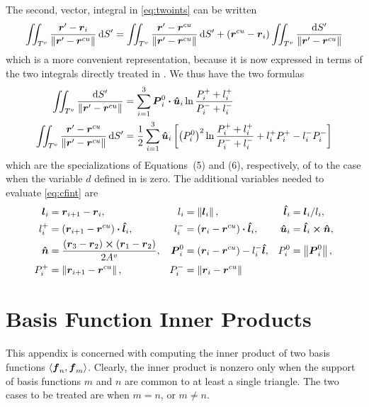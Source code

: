 \documentclass[
letterpaper, %
11pt, %
oneside, 
onecolumn, %
openany, %
]{memoir}
\numberwithin{equation}{chapter}
\numberwithin{figure}{chapter}
\begin{document}
 The second, vector, integral in \eqref{eq:twoints} can be written
 \begin{equation}
   \iint_{T^v} \frac{\boldsymbol{r}'-\boldsymbol{r}_i}{\left\lVert\boldsymbol{r}' - \boldsymbol{r}^{cu}\right\rVert} \, \text{d} S' =
   \iint_{T^v} \frac{\boldsymbol{r}'-\boldsymbol{r}^{cu}}{\left\lVert\boldsymbol{r}' - \boldsymbol{r}^{cu}\right\rVert} \, \text{d} S' +
   (\boldsymbol{r}^{cu} - \boldsymbol{r}_i) \iint_{T^v} \frac{\text{d} S'}{\left\lVert\boldsymbol{r}' - \boldsymbol{r}^{cu}\right\rVert}
 \end{equation}
 which is a more convenient representation, because it is now
 expressed in terms of the two integrals directly treated in \cite{wrgs:84}.
 We thus have the two formulas
 \begin{subequations}
   \label{eq:cfint}
   \begin{align}
     \iint_{T^v} \frac{\text{d} S'}{\left\lVert\boldsymbol{r}' - \boldsymbol{r}^{cu}\right\rVert} &= 
     \sum_{i=1}^{3} \boldsymbol{P}_i^0 \boldsymbol{\cdot} \boldsymbol{\hat{u}}_i \ln \frac{P_i^+ + l_i^+}{P_i^- + l_i^-} \\
     \iint_{T^v} \frac{\boldsymbol{r}'-\boldsymbol{r}^{cu}}{\left\lVert\boldsymbol{r}' - \boldsymbol{r}^{cu}\right\rVert} \, \text{d} S' &=
     \frac{1}{2} \sum_{i=1}^{3} \boldsymbol{\hat{u}}_i 
     \left[
       \left( P_i^0 \right)^2 
       \ln \frac{P_i^+ + l_i^+}{P_i^- + l_i^-}
       + l_i^+ P_i^+ - l_i^- P_i^-
     \right]
 \end{align} 
\end{subequations}
\noindent
which are the specializations of Equations~(5) and (6), respectively, of 
\cite{wrgs:84} to the case when the variable $d$ defined in \cite{wrgs:84}
is zero.  The additional variables needed to evaluate \eqref{eq:cfint} are
\begin{subequations}
\begin{align}
  \boldsymbol{l}_i &= \boldsymbol{r}_{i+1} - \boldsymbol{r}_i, & l_i &= \left\lVert\boldsymbol{l}_i\right\rVert, & \boldsymbol{\hat{l}}_i &= \boldsymbol{l}_i / l_i, \\
  l_i^+ &= (\boldsymbol{r}_{i+1} - \boldsymbol{r}^{cu}) \boldsymbol{\cdot} \boldsymbol{\hat{l}}_i, & 
  l_i^- &= (\boldsymbol{r}_{i} - \boldsymbol{r}^{cu}) \boldsymbol{\cdot} \boldsymbol{\hat{l}}_i, &
  \boldsymbol{\hat{u}}_i &= \boldsymbol{\hat{l}}_i \boldsymbol{\times} \boldsymbol{\hat{n}}, \\
  \boldsymbol{\hat{n}} &= \frac{(\boldsymbol{r}_3-\boldsymbol{r}_2)\boldsymbol{\times}(\boldsymbol{r}_1-\boldsymbol{r}_2)}{2A^v}, &
  \boldsymbol{P}_i^0 &= (\boldsymbol{r}_i - \boldsymbol{r}^{cu}) - l_i^- \boldsymbol{\hat{l}}, &
  P_i^0 &= \left\lVert\boldsymbol{P}_i^0\right\rVert, \\
  P_i^+ &= \left\lVert\boldsymbol{r}_{i+1} - \boldsymbol{r}^{cu}\right\rVert, &  P_i^- &= \left\lVert\boldsymbol{r}_{i} - \boldsymbol{r}^{cu}\right\rVert
\end{align}
\end{subequations}


\section{Basis Function Inner Products\label{ap:ip}}
This appendix is concerned with computing the inner product of two basis
functions $\left< \boldsymbol{f}_n, \boldsymbol{f}_m \right>$.  Clearly, the inner product is nonzero 
only when the support of basis functions $m$ and $n$ are common to at 
least a single triangle.  The  
two cases to be treated are when $m=n$, or $m \neq n$.
\end{document}
